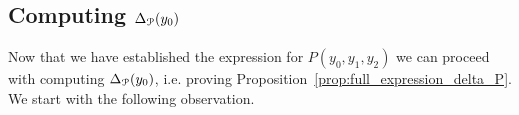 %
%
%
%
%
%

\subsection{Computing $\Delta_{{\mathcal P}}(y_0)$}

Now that we have established the expression for $P(y_0,y_1,y_2)$ we can proceed with computing $\Delta_{{\mathcal P}}(y_0)$, i.e. proving Proposition~\ref{prop:full_expression_delta_P}. We start with the following observation.

